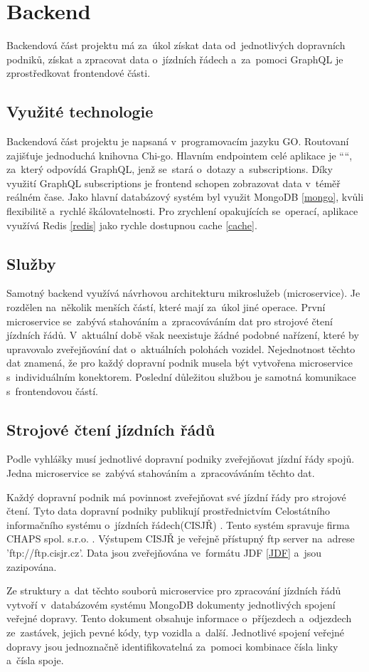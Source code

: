\newpage
\section{Backend}
Backendová část projektu má za~úkol získat data od~jednotlivých dopravních podniků, získat a zpracovat data o~jízdních řádech \cite{cisjr} a~za~pomoci GraphQL je zprostředkovat frontendové části.
\subsection{Využité technologie} Backendová část projektu je napsaná v~programovacím jazyku GO. Routovaní zajišťuje jednoduchá knihovna Chi-go. Hlavním endpointem celé aplikace je ““, za~který odpovídá GraphQL, jenž se~stará o~dotazy a~subscriptions. Díky využití GraphQL subscriptions je frontend schopen zobrazovat data v~téměř reálném čase. Jako hlavní databázový systém byl využit MongoDB \ref{mongo}, kvůli flexibilitě a~rychlé škálovatelnosti. Pro zrychlení opakujících se~operací, aplikace využívá Redis \ref{redis} jako rychle dostupnou cache \ref{cache}. \par
\subsection{Služby}
Samotný backend využívá návrhovou architekturu mikroslužeb (microservice). Je rozdělen na~několik menších částí, které mají za~úkol jiné operace. První microservice se~zabývá stahováním a~zpracováváním dat pro strojové čtení jízdních řádů. V~aktuální době však neexistuje žádné podobné nařízení, které by upravovalo zveřejňování dat o~aktuálních polohách vozidel. Nejednotnost těchto dat znamená, že pro každý dopravní podnik musela být vytvořena microservice s~individuálním konektorem. Poslední důležitou službou je samotná komunikace s~frontendovou částí.
\subsection [Jízdní řády]{Strojové čtení jízdních řádů} \label{strojoveCteniJR}
Podle vyhlášky \cite{vyhlaskaJizdniRady} musí jednotlivé dopravní podniky zveřejňovat jízdní řády spojů. Jedna microservice se~zabývá stahováním a~zpracováváním těchto dat. \par
Každý dopravní podnik má povinnost zveřejňovat své jízdní řády pro strojové čtení. Tyto data dopravní podniky publikují prostřednictvím Celostátního informačního systému o~jízdních řádech(CISJŘ) \cite{cisjr}. Tento systém spravuje firma CHAPS spol. s.r.o. \cite{chaps}. Výstupem CISJŘ je veřejně přístupný ftp server na~adrese 'ftp://ftp.cisjr.cz'. Data jsou zveřejňována ve~formátu JDF \ref{JDF} a~jsou zazipována. \par
Ze struktury a~dat těchto souborů microservice pro zpracování jízdních řádů vytvoří v~databázovém systému MongoDB dokumenty jednotlivých spojení veřejné dopravy. Tento dokument obsahuje informace o~příjezdech a~odjezdech ze~zastávek, jejich pevné kódy, typ vozidla a~další. Jednotlivé spojení veřejné dopravy jsou jednoznačně identifikovatelná za~pomoci kombinace čísla linky a~čísla spoje.
